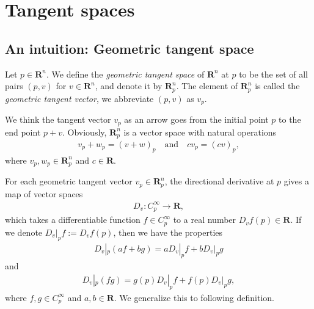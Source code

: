 
\chapter{Tangent spaces}

\begin{comment}
    \begin{definition}[Germ]
        Let $C^\infty_p$ be the set of all smooth function defined on some neighborhood of $p$. Let $f, g \in C^\infty_p$ with domains $U$ and $V$, respectively. We define the equivalence relation $f \sim g$ if there exists an open set $W \subset V \cap U$ such that $f = g$ on $W$. We denote the equivalence class of $f$ by $[f]$, which is called a \emph{$C^\infty$-germ} of $f$ at $p$.
    \end{definition}
    \end{comment}

\section{An intuition: Geometric tangent space}

\begin{definition}
    Let $p \in \mathbf{R}^n$. We define the \emph{geometric tangent space} of $\mathbf{R}^n$ at $p$ to be the set of all pairs $(p, v)$ for $v \in \mathbf{R}^n$, and denote it by $\mathbf{R}^n_p$. The element of $\mathbf{R}^n_p$ is called the \emph{geometric tangent vector}, we abbreviate $(p, v)$ as $v_p$.
\end{definition}

We think the tangent vector $v_p$ as an arrow goes from the initial point $p$ to the end point $p + v$. Obviously, $\mathbf{R}^n_p$ is a vector space with natural operations
    \begin{align*}
        v_p + w_p = (v + w)_p
        \quad\text{and}\quad
        cv_p = (cv)_p,
    \end{align*}
where $v_p, w_p \in \mathbf{R}^n_p$ and $c \in \mathbf{R}$.

For each geometric tangent vector $v_p \in \mathbf{R}^n_p$, the directional derivative at $p$ gives a map of vector spaces
    \begin{align*}
        D_v : C^\infty_p \to \mathbf{R},
    \end{align*}
which takes a differentiable function $f \in C^\infty_p$ to a real number $D_vf(p) \in \mathbf{R}$. If we denote $D_v|_p f := D_vf(p)$, then we have the properties
    \begin{align*}
        D_v|_p(a f + bg) = aD_v|_pf + bD_v|_pg
    \end{align*}
and
    \begin{align*}
        D_v|_p(fg) = g(p)D_v|_pf + f(p)D_v|_pg,
    \end{align*}
where $f, g \in C^\infty_p$ and $a, b \in \mathbf{R}$. We generalize this to following definition.

